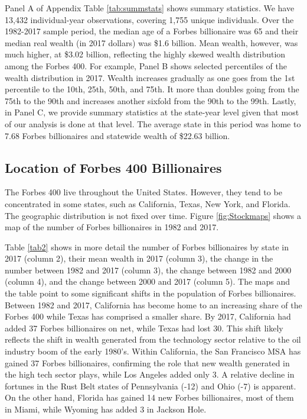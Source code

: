 \documentclass[12pt]{article}
\begin{document}
Panel A of Appendix Table \ref{tab:summstats} shows summary statistics. We have 13,432 individual-year observations, covering 1,755 unique individuals. Over the 1982-2017 sample period, the median age of a Forbes billionaire was 65 and their median real wealth (in 2017 dollars) was \$1.6 billion. Mean wealth, however, was much higher, at \$3.02 billion, reflecting the highly skewed wealth distribution among the Forbes 400. For example, Panel B shows selected percentiles of the wealth distribution in 2017. Wealth increases gradually as one goes from the 1st percentile to the 10th, 25th, 50th, and 75th. It more than doubles going from the 75th to the 90th and increases another sixfold from the 90th to the 99th. 
Lastly, in Panel C, we provide summary statistics at the state-year level given that most of our analysis is done at that level. The average state in this period was home to 7.68 Forbes billionaires and statewide wealth of \$22.63 billion. 


\subsection{Location of Forbes 400 Billionaires}

The Forbes 400 live throughout the United States. However, they tend to be concentrated in some states, such as California, Texas, New York, and Florida. The geographic distribution is not fixed over time. 
Figure \ref{fig:Stockmaps} shows a map of the number of Forbes billionaires in 1982 and 2017. 

Table \ref{tab2} shows in more detail the number of Forbes billionaires by state in 2017 (column 2), their mean wealth in 2017 (column 3), the change in the number between 1982 and 2017 (column 3), the change between 1982 and 2000 (column 4), and the change between 2000 and 2017 (column 5). The maps and the table point to some significant shifts in the population of Forbes billionaires. Between 1982 and 2017, California has become home to an increasing share of the Forbes 400 while Texas has comprised a smaller share. By 2017, California had added 37 Forbes billionaires on net, while Texas had lost 30. This shift likely reflects the shift in wealth generated from the technology sector relative to the oil industry boom of the early 1980's. Within California, the San Francisco MSA has gained 37 Forbes billionaires, confirming the role that new wealth generated in the high tech sector plays, while Los Angeles added only 3. A relative decline in fortunes in the Rust Belt states of Pennsylvania (-12) and Ohio (-7) is apparent. On the other hand, Florida has gained 14 new Forbes billionaires, most of them in Miami, while Wyoming has added 3 in Jackson Hole.  
\end{document}
